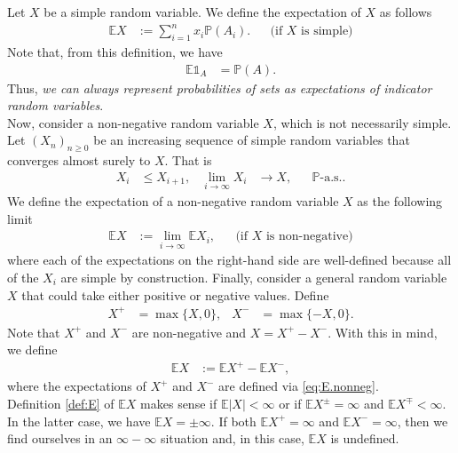 \documentclass[12pt]{book}
\numberwithin{equation}{chapter}
\theoremstyle{plain}
\numberwithin{theorem}{section}
\theoremstyle{definition}
\numberwithin{exercise}{chapter}
\newcommand{\<}{\langle}
\renewcommand{\>}{\rangle}
\renewcommand{\(}{\left(}
\renewcommand{\)}{\right)}
\renewcommand{\[}{\left[}
\renewcommand{\]}{\right]}
\newcommand\Eb{\mathds{E}}
\newcommand\Ib{\mathds{1}} 	%
\newcommand\Pb{\mathds{P}}
\newcommand\om{\omega}
\newcommand\Om{\Omega}
\begin{document}
\noindent
Let $X$ be a simple random variable.  We define the expectation of $X$ as follows
\begin{align}
\Eb X
	&:=	\sum_{i=1}^n x_i \Pb(A_i) . &
	&\text{(if $X$ is simple)}
\end{align}
Note that, from this definition, we have
\begin{align}
\Eb \Ib_A
	&=	\Pb(A) .
\end{align}
Thus, \emph{we can always represent probabilities of sets as expectations of indicator random variables}.
\\[0.5em]
Now, consider a non-negative random variable $X$, which is not necessarily simple.  Let $(X_n)_{n \geq 0}$ be an increasing sequence of simple random variables that converges almost surely to $X$.  That is
\begin{align}
X_i
	&\leq X_{i+1} , &
\lim_{i \to \infty} X_i 
	&\to X , &
	&\text{$\Pb$-a.s.}.
\end{align}
We define the expectation of a non-negative random variable $X$ as the following limit
\begin{align}
\Eb X
	&:=	\lim_{i \to \infty} \Eb X_i , &
	&\text{(if $X$ is non-negative)} \label{eq:E.nonneg}
\end{align}
where each of the expectations on the right-hand side are well-defined because all of the $X_i$ are simple by construction.
Finally, consider a general random variable $X$ that could take either positive or negative values.  Define
\begin{align}
X^+
	&=	\max\{ X, 0 \} , &
X^-
	&=	\max\{ -X, 0 \} 	.
\end{align}
Note that $X^+$ and $X^-$ are non-negative and $X = X^+ - X^-$.  With this in mind, we define
\begin{align}
\Eb X
	&:=	\Eb X^+ - \Eb X^- ,
\end{align}
where the expectations of $X^+$ and $X^-$ are defined via \eqref{eq:E.nonneg}.
\\[0.5em]
Definition \ref{def:E} of $\Eb X$ makes sense if $\Eb|X|<\infty$ or if $\Eb X^\pm = \infty$ and $\Eb X^\mp < \infty$.  In the latter case, we have $\Eb X = \pm \infty$.
If both $\Eb X^+ = \infty$ and $\Eb X^- = \infty$, then we find ourselves in an $\infty - \infty$ situation and, in this case, $\Eb X$ is undefined.
\end{document}
